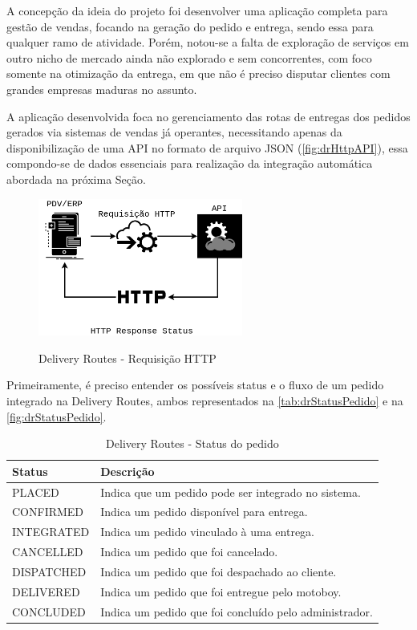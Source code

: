 A concepção da ideia do projeto foi desenvolver uma aplicação completa para gestão de vendas, focando na geração do pedido e entrega, sendo essa para qualquer ramo de atividade. Porém, notou-se a falta de exploração de serviços em outro nicho de mercado ainda não explorado e sem concorrentes, com foco somente na otimização da entrega, em que não é preciso disputar clientes com grandes empresas maduras no assunto.
 
A aplicação desenvolvida foca no gerenciamento das rotas de entregas dos pedidos gerados via sistemas de vendas já operantes, necessitando apenas da disponibilização de uma API no formato de arquivo JSON (\autoref{fig:drHttpAPI}), essa compondo-se de dados essenciais para realização da integração automática abordada na próxima Seção.
 
  \begin{figure}[H]
    \centering
    \caption{Delivery Routes - Requisição HTTP}
    \includegraphics[width=0.6\textwidth]{./dados/figuras/fig16}
    \label{fig:drHttpAPI}
\end{figure}

Primeiramente, é preciso entender os possíveis status e o fluxo de um pedido integrado na Delivery Routes, ambos representados na \autoref{tab:drStatusPedido} e na \autoref{fig:drStatusPedido}.

\begin{table}[H]
    \centering
    \caption{Delivery Routes - Status do pedido
    \label{tab:drStatusPedido}}
\begin{tabular}{|l|l|}
\hline
\textbf{Status} & \textbf{Descrição} \\ \hline
PLACED & Indica que um pedido pode ser integrado no sistema. \\ \hline
CONFIRMED & Indica um pedido disponível para entrega. \\ \hline
INTEGRATED & Indica um pedido vinculado à uma entrega. \\ \hline
CANCELLED & Indica um pedido que foi cancelado. \\ \hline
DISPATCHED & Indica um pedido que foi despachado ao cliente. \\ \hline
DELIVERED & Indica um pedido que foi entregue pelo motoboy. \\ \hline
CONCLUDED & Indica um pedido que foi concluído pelo administrador. \\ \hline
\end{tabular}
\end{table}
 
